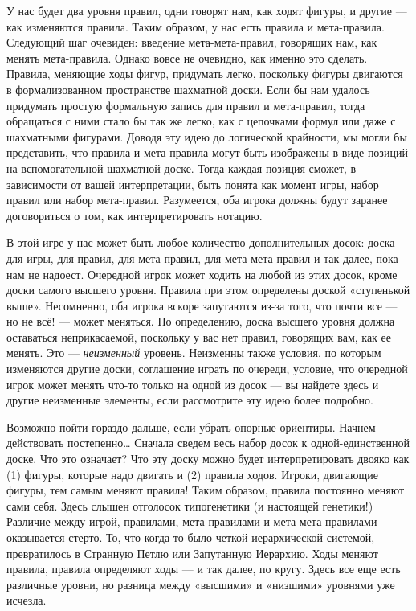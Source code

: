 У нас будет два уровня правил, одни говорят нам, как ходят фигуры, и другие --- как изменяются правила. Таким образом, у нас есть правила и мета-правила. Следующий шаг очевиден: введение мета-мета-правил, говорящих нам, как менять мета-правила. Однако вовсе не очевидно, как именно это сделать. Правила, меняющие ходы фигур, придумать легко, поскольку фигуры двигаются в формализованном пространстве шахматной доски. Если бы нам удалось придумать простую формальную запись для правил и мета-правил, тогда обращаться с ними стало бы так же легко, как с цепочками формул или даже с шахматными фигурами. Доводя эту идею до логической крайности, мы могли бы представить, что правила и мета-правила могут быть изображены в виде позиций на вспомогательной шахматной доске. Тогда каждая позиция сможет, в зависимости от вашей интерпретации, быть понята как момент игры, набор правил или набор мета-правил. Разумеется, оба игрока должны будут заранее договориться о том, как интерпретировать нотацию.

В этой игре у нас может быть любое количество дополнительных досок: доска для игры, для правил, для мета-правил, для мета-мета-правил и так далее, пока нам не надоест. Очередной игрок может ходить на любой из этих досок, кроме доски самого высшего уровня. Правила при этом определены доской «ступенькой выше». Несомненно, оба игрока вскоре запутаются из-за того, что почти все --- но не всё! --- может меняться. По определению, доска высшего уровня должна оставаться неприкасаемой, поскольку у вас нет правил, говорящих вам, как ее менять. Это --- \emph{неизменный} уровень. Неизменны также условия, по которым изменяются другие доски, соглашение играть по очереди, условие, что очередной игрок может менять что-то только на одной из досок --- вы найдете здесь и другие неизменные элементы, если рассмотрите эту идею более подробно.

Возможно пойти гораздо дальше, если убрать опорные ориентиры. Начнем действовать постепенно\ldots{} Сначала сведем весь набор досок к одной-единственной доске. Что это означает? Что эту доску можно будет интерпретировать двояко как (1) фигуры, которые надо двигать и (2) правила ходов. Игроки, двигающие фигуры, тем самым меняют правила! Таким образом, правила постоянно меняют сами себя. Здесь слышен отголосок типогенетики (и настоящей генетики!) Различие между игрой, правилами, мета-правилами и мета-мета-правилами оказывается стерто. То, что когда-то было четкой иерархической системой, превратилось в Странную Петлю или Запутанную Иерархию. Ходы меняют правила, правила определяют ходы --- и так далее, по кругу. Здесь все еще есть различные уровни, но разница между «высшими» и «низшими» уровнями уже исчезла.

